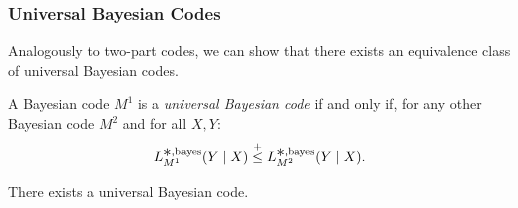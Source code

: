 \subsubsection{Universal Bayesian Codes}

Analogously to two-part codes, we can show that there exists an equivalence class of universal Bayesian codes.

\begin{defn}
A Bayesian code $M^1$ is a \emph{universal Bayesian code} if and only if, for any other Bayesian code $M^2$ and for all $X,Y$:
\begin{equation}
L^{\bigast,\text{bayes}}_{M^1}(Y \mid X) \leqc L^{\bigast,\text{bayes}}_{M^2}(Y \mid X).
\end{equation}
\end{defn}

\begin{lemma}\label{thm:universal-bayesian-existence}
There exists a universal Bayesian code.
\end{lemma}

